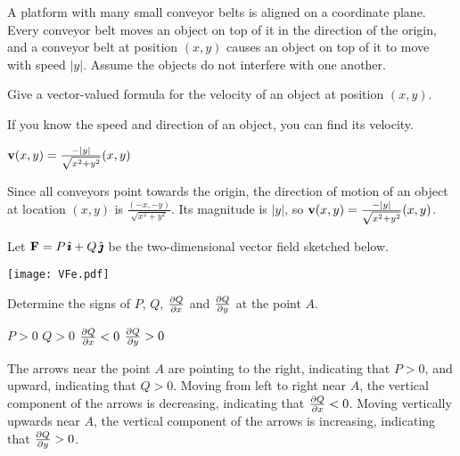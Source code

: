 \begin{question}
A platform with many small conveyor belts is aligned on a coordinate plane. Every conveyor belt moves an object on top of it in the direction of the origin, and a conveyor belt at position $(x,y)$ causes an object on top of it to move with speed $|y|$. Assume the objects do not interfere with one another.

 Give a vector-valued formula for the velocity of an object at position $(x,y)$.
 \end{question}

\begin{hint} 
If you know the speed and direction of an object, you can find its velocity.
\end{hint}

\begin{answer} 
$\mathbf{v}(x,y)=\frac{-|y|}{\sqrt{x^2+y^2}}(x,y)$
\end{answer}

\begin{solution}

\item  Since all conveyors point towards the origin, the direction of motion of an object at location $(x,y)$ is $\frac{(-x,-y)}{\sqrt{x^2+y^2}}$. Its magnitude is $|y|$, so $\mathbf{v}(x,y)=\frac{-|y|}{\sqrt{x^2+y^2}}(x,y)$.
\end{solution}

\begin{question}
Let $\mathbf{F} = P\,\hat{\pmb{\imath}} + Q\,\hat{\pmb{\jmath}}$ be the two-dimensional vector field sketched below.
\begin{center}
      \texttt{[image: VFe.pdf]}
\end{center}
 Determine the signs of $P$, $Q$, $\pdiff{Q}{x}$
and $\pdiff{Q}{y}$ at the point $A$.
\end{question}

\begin{hint} 
\end{hint}

\begin{answer} 
$P>0$\qquad
$Q>0$\qquad
$\pdiff{Q}{x}<0$\qquad
$\pdiff{Q}{y}>0$
\end{answer}

\begin{solution}
The arrows near the point $A$ are pointing to the
right, indicating that $P>0$, and upward, indicating
that $Q>0$. Moving from left to right near $A$, the
vertical component of the arrows is decreasing, indicating that 
$\pdiff{Q}{x}<0$.  Moving vertically
upwards near $A$, the vertical component of the arrows is 
increasing, indicating that $\pdiff{Q}{y}>0$.

\end{solution}

